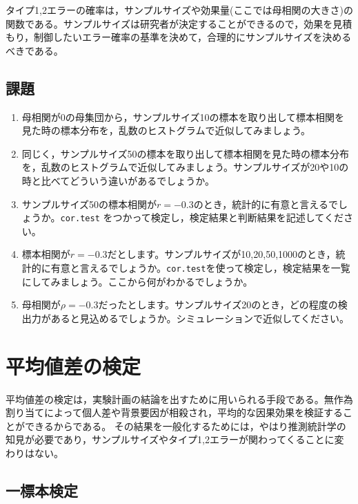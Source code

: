 \documentclass[
  a4paper,
]{ltjsbook}
\providecommand{\tightlist}{%
  \setlength{\itemsep}{0pt}\setlength{\parskip}{0pt}}
\begin{document}
タイプ1,2エラーの確率は，サンプルサイズや効果量(ここでは母相関の大きさ)の関数である。サンプルサイズは研究者が決定することができるので，効果を見積もり，制御したいエラー確率の基準を決めて，合理的にサンプルサイズを決めるべきである。

\section{課題}\label{ux8ab2ux984c-5}

\begin{enumerate}
\def\labelenumi{\arabic{enumi}.}
\tightlist
\item
  母相関が0の母集団から，サンプルサイズ10の標本を取り出して標本相関を見た時の標本分布を，乱数のヒストグラムで近似してみましょう。
\item
  同じく，サンプルサイズ50の標本を取り出して標本相関を見た時の標本分布を，乱数のヒストグラムで近似してみましょう。サンプルサイズが20や10の時と比べてどういう違いがあるでしょうか。
\item
  サンプルサイズ50の標本相関が\(r=-0.3\)のとき，統計的に有意と言えるでしょうか。\texttt{cor.test}
  をつかって検定し，検定結果と判断結果を記述してください。
\item
  標本相関が\(r=-0.3\)だとします。サンプルサイズが10,20,50,1000のとき，統計的に有意と言えるでしょうか。\texttt{cor.test}を使って検定し，検定結果を一覧にしてみましょう。ここから何がわかるでしょうか。
\item
  母相関が\(\rho = -0.3\)だったとします。サンプルサイズ20のとき，どの程度の検出力があると見込めるでしょうか。シミュレーションで近似してください。
\end{enumerate}


\chapter{平均値差の検定}\label{ux5e73ux5747ux5024ux5deeux306eux691cux5b9a}

平均値差の検定は，実験計画の結論を出すために用いられる手段である。無作為割り当てによって個人差や背景要因が相殺され，平均的な因果効果を検証することができるからである。
その結果を一般化するためには，やはり推測統計学の知見が必要であり，サンプルサイズやタイプ1,2エラーが関わってくることに変わりはない。

\section{一標本検定}\label{ux4e00ux6a19ux672cux691cux5b9a}
\end{document}
